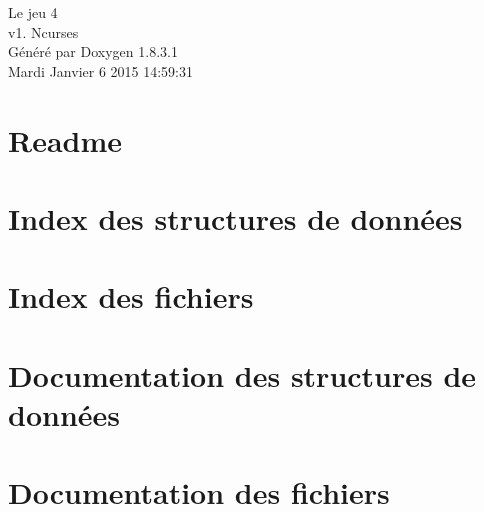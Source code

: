 \documentclass{book}
\begin{document}
\hypersetup{pageanchor=false,citecolor=blue}
\begin{titlepage}
\vspace*{7cm}
\begin{center}
{\Large Le jeu 4 \\[1ex]\large v1. Ncurses }\\
\vspace*{1cm}
{\large Généré par Doxygen 1.8.3.1}\\
\vspace*{0.5cm}
{\small Mardi Janvier 6 2015 14:59:31}\\
\end{center}
\end{titlepage}
\clearemptydoublepage
{}
\tableofcontents
\clearemptydoublepage
{}
\hypersetup{pageanchor=true,citecolor=blue}
\chapter{Readme}
\label{md_Readme}
\hypertarget{md_Readme}{}

\chapter{Index des structures de données}

\chapter{Index des fichiers}

\chapter{Documentation des structures de données}







\chapter{Documentation des fichiers}









\printindex
\end{document}
